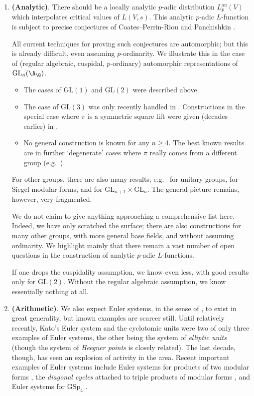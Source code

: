\documentclass[a4paper,10pt, english, reqno]{smfart}
\newcommand{\GL}{\mathrm{GL}}
\numberwithin{equation}{section}
\begin{document}
\begin{enumerate}\setlength{\itemsep}{5pt}
	\item \textbf{(Analytic)}. There should be a locally analytic $p$-adic distribution $L_p^\mathrm{an}(V)$ which interpolates critical values of $L(V,s)$. 
 This analytic $p$-adic $L$-function is subject to precise conjectures of Coates--Perrin-Riou and Panchishkin \cite{coatesperrinriou89, coates89, Pan94}.
	
All current techniques for proving such conjectures are automorphic; but this is already difficult, even assuming $p$-ordinarity. We illustrate this in the case of (regular algebraic, cuspidal, $p$-ordinary) automorphic representations of $\GL_n(\A_{\Q})$. 
 \begin{itemize}
\item The cases of $\GL(1)$ and $\GL(2)$ were described above.
\item The case of $\GL(3)$ was only recently handled in \cite{LW-GL3}. Constructions in the special case where $\pi$ is a symmetric square lift were given (decades earlier) in \cite{Sch88, Hid90}.
\item No general construction is known for any $n\geq4$. The best known results are in further `degenerate' cases where $\pi$ really comes from a different group (e.g.\ \cite{AG94}). 
 \end{itemize}

 For other groups, there are also many results; e.g.\ \cite{EHLS16} for unitary groups, \cite{LPSZ19, Liu16} for Siegel modular forms, and \cite{KMS00, Jan-Non-Abelian} for $\GL_{n+1}\times\GL_n$. The general picture remains, however, very fragmented.
 
 
We do not claim to give anything approaching a comprehensive list here. Indeed, we have only scratched the surface; there are also constructions for many other groups, with more general base fields, and without assuming ordinarity. We highlight mainly that there remain a vast number of open questions in the construction of analytic $p$-adic $L$-functions.

If one drops the cuspidality assumption, we know even less, with good results only for $\GL(2)$. Without the regular algebraic assumption, we know essentially nothing at all.
 
 

	
\item \textbf{(Arithmetic)}.  We also expect Euler systems, in the sense of \cite{Rub00}, to exist in great generality, but known examples are scarcer still. Until relatively recently, Kato's Euler system and the cyclotomic units were two of only three examples of Euler systems, the other being the system of \emph{elliptic units} (though the system of \emph{Heegner points} is closely related). The last decade, though, has seen an explosion of activity in the area. Recent important examples of Euler systems include Euler systems for products of two modular forms \cite{LLZ14}, the \emph{diagonal cycles} attached to triple products of modular forms \cite{DR14}, and Euler systems for $\mathrm{GSp}_4$ \cite{LSZ17}.
	

\end{enumerate}
\end{document}

